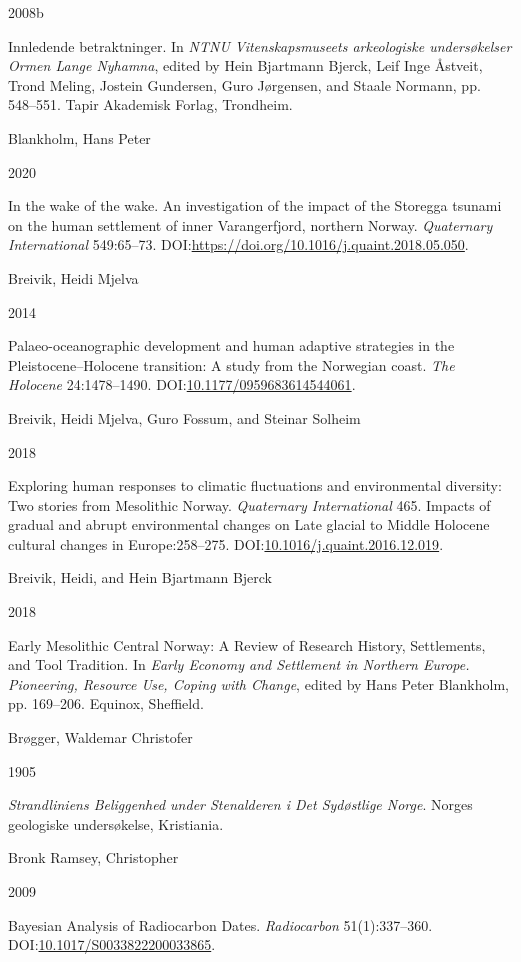 \documentclass[
]{article}
\newlength{\cslhangindent}
\newlength{\csllabelwidth}
\newlength{\cslentryspacingunit} %
\newenvironment{CSLReferences}[2] %
 {%
  \setlength{\parindent}{0pt}
  \ifodd #1
  \let\oldpar\par
  \def\par{\hangindent=\cslhangindent\oldpar}
  \fi
  \setlength{\parskip}{#2\cslentryspacingunit}
 }%
 {}
\newcommand{\CSLBlock}[1]{#1\hfill\break}
\newcommand{\CSLLeftMargin}[1]{\parbox[t]{\csllabelwidth}{#1}}
\newcommand{\CSLRightInline}[1]{\parbox[t]{\linewidth - \csllabelwidth}{#1}\break}
\begin{document}
\begin{CSLReferences}{0}{0}
\leavevmode{}%
\CSLLeftMargin{ 2008b }
\CSLRightInline{Innledende betraktninger. In \emph{{NTNU Vitenskapsmuseets arkeologiske undersøkelser Ormen Lange Nyhamna}}, edited by Hein Bjartmann Bjerck, Leif Inge Åstveit, Trond Meling, Jostein Gundersen, Guro Jørgensen, and Staale Normann, pp. 548--551. Tapir Akademisk Forlag, Trondheim.}

\leavevmode{}%
\CSLBlock{Blankholm, Hans Peter}
\CSLLeftMargin{ 2020}
\CSLRightInline{{In the wake of the wake. An investigation of the impact of the Storegga tsunami on the human settlement of inner Varangerfjord, northern Norway}. \emph{Quaternary International} 549:65--73. DOI:\url{https://doi.org/10.1016/j.quaint.2018.05.050}.}

\leavevmode{}%
\CSLBlock{Breivik, Heidi Mjelva}
\CSLLeftMargin{ 2014}
\CSLRightInline{Palaeo-oceanographic development and human adaptive strategies in the Pleistocene--Holocene transition: A study from the Norwegian coast. \emph{The Holocene} 24:1478--1490. DOI:\href{https://doi.org/10.1177/0959683614544061}{10.1177/0959683614544061}.}

\leavevmode{}%
\CSLBlock{Breivik, Heidi Mjelva, Guro Fossum, and Steinar Solheim}
\CSLLeftMargin{ 2018}
\CSLRightInline{Exploring human responses to climatic fluctuations and environmental diversity: Two stories from Mesolithic Norway. \emph{Quaternary International} 465. Impacts of gradual and abrupt environmental changes on Late glacial to Middle Holocene cultural changes in Europe:258--275. DOI:\href{https://doi.org/10.1016/j.quaint.2016.12.019}{10.1016/j.quaint.2016.12.019}.}

\leavevmode{}%
\CSLBlock{Breivik, Heidi, and Hein Bjartmann Bjerck}
\CSLLeftMargin{ 2018}
\CSLRightInline{{Early Mesolithic Central Norway: A Review of Research History, Settlements, and Tool Tradition}. In \emph{{Early Economy and Settlement in Northern Europe. Pioneering, Resource Use, Coping with Change}}, edited by Hans Peter Blankholm, pp. 169--206. Equinox, Sheffield.}

\leavevmode{}%
\CSLBlock{Brøgger, Waldemar Christofer}
\CSLLeftMargin{ 1905}
\CSLRightInline{\emph{{Strandliniens Beliggenhed under Stenalderen i Det Sydøstlige Norge}}. Norges geologiske undersøkelse, Kristiania.}

\leavevmode{}%
\CSLBlock{Bronk Ramsey, Christopher}
\CSLLeftMargin{ 2009}
\CSLRightInline{Bayesian Analysis of Radiocarbon Dates. \emph{Radiocarbon} 51(1):337--360. DOI:\href{https://doi.org/10.1017/S0033822200033865}{10.1017/S0033822200033865}.}


\end{CSLReferences}
\end{document}
